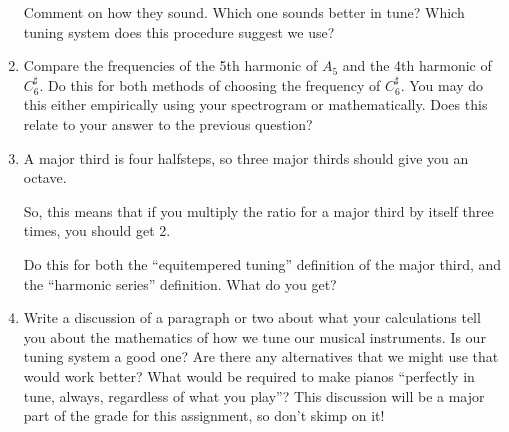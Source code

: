 \documentclass[12pt]{article}
\begin{document}
\begin{enumerate}
	Comment on how they sound. Which one sounds better in tune? Which tuning system does this procedure suggest we use?

      \item Compare the frequencies of the 5th harmonic of $A_5$ and the 4th harmonic of $C^\sharp_6$. Do this for both methods of choosing the frequency of $C^\sharp_6$. 
	You may do this either empirically using your spectrogram or mathematically. Does this relate to your answer to the previous question?

      \item A major third is four halfsteps, so three major thirds should give you an octave. 

	So, this means that if you multiply the ratio for a major third by itself three times, you should get 2.

	Do this for both the ``equitempered tuning'' definition of the major third, and the ``harmonic series'' definition. What do you get?

      \item Write a discussion of a paragraph or two about what your calculations tell you about the mathematics of how we tune our musical instruments.
	Is our tuning system a good one? Are there any alternatives that we might use that would work better? What would be required to make pianos ``perfectly in tune,
	always, regardless of what you play''? This discussion will be a major part of the grade for this assignment, so don't skimp on it!
	




    \end{enumerate}

  
\end{document}
